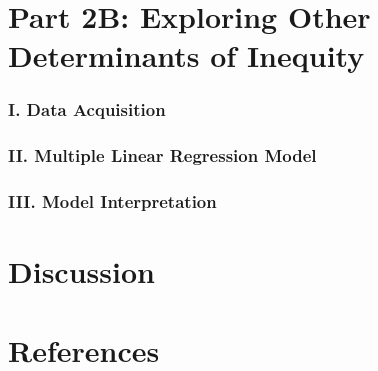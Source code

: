 \documentclass[
  a4paper,
  DIV=11,
  numbers=noendperiod]{scrartcl}
\begin{document}
\hypertarget{part-2b-exploring-other-determinants-of-inequity}{%
\section{Part 2B: Exploring Other Determinants of
Inequity}\label{part-2b-exploring-other-determinants-of-inequity}}

\hypertarget{i.-data-acquisition}{%
\subsubsection{I. Data Acquisition}\label{i.-data-acquisition}}

\hypertarget{ii.-multiple-linear-regression-model}{%
\subsubsection{II. Multiple Linear Regression
Model}\label{ii.-multiple-linear-regression-model}}

\hypertarget{iii.-model-interpretation}{%
\subsubsection{III. Model
Interpretation}\label{iii.-model-interpretation}}

\hypertarget{discussion}{%
\section{Discussion}\label{discussion}}

\hypertarget{references}{%
\section{References}\label{references}}
\end{document}
